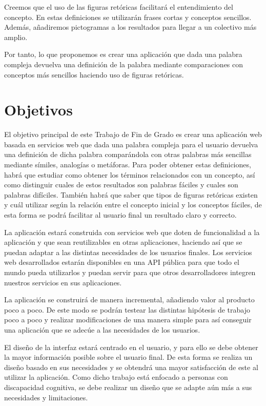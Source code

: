 Creemos que el uso de las figuras retóricas facilitará el entendimiento del concepto. En estas definiciones se utilizarán frases cortas y conceptos sencillos. 
Además, añadiremos pictogramas a los resultados para llegar a un colectivo más amplio.

Por tanto, lo que proponemos es crear una aplicación que dada una palabra compleja devuelva una definición de la palabra mediante comparaciones con conceptos más sencillos haciendo uso de figuras retóricas.

\section{Objetivos}
\label{cap:sec:objetivos}

El objetivo principal de este Trabajo de Fin de Grado es crear una aplicación web basada en servicios web que dada una palabra compleja para el usuario devuelva una definición de dicha palabra comparándola con otras palabras más sencillas mediante símiles, analogías o metáforas. 
Para poder obtener estas definiciones, habrá que estudiar como obtener los términos relacionados con un concepto, así como distinguir cuales de estos resultados son palabras fáciles y cuales son palabras difíciles. 
También habrá que saber que tipos de figuras retóricas existen y cuál utilizar según la relación entre el concepto inicial y los conceptos fáciles, de esta forma se podrá facilitar al usuario final un resultado claro y correcto.

La aplicación estará construida con servicios web que doten de funcionalidad a la aplicación y que sean reutilizables en otras aplicaciones, haciendo así que se puedan adaptar a las distintas necesidades de los usuarios finales.
Los servicios web desarrollados estarán disponibles en una API pública para que todo el mundo pueda utilizarlos y puedan servir para que otros desarrolladores integren nuestros servicios en sus aplicaciones.

La aplicación se construirá de manera incremental, añadiendo valor al producto poco a poco. De este modo se podrán testear las distintas hipótesis de trabajo poco a poco y realizar modificaciones de una manera simple para así conseguir una aplicación que se adecúe a las necesidades de los usuarios.

El diseño de la interfaz estará centrado en el usuario, y para ello se debe obtener la mayor información posible sobre el usuario final. De esta forma se realiza un diseño basado en sus necesidades y se obtendrá una mayor satisfacción de este al utilizar la aplicación.
Como dicho trabajo está enfocado a personas con discapacidad cognitiva, se debe realizar un diseño que se adapte aún más a sus necesidades y limitaciones.

